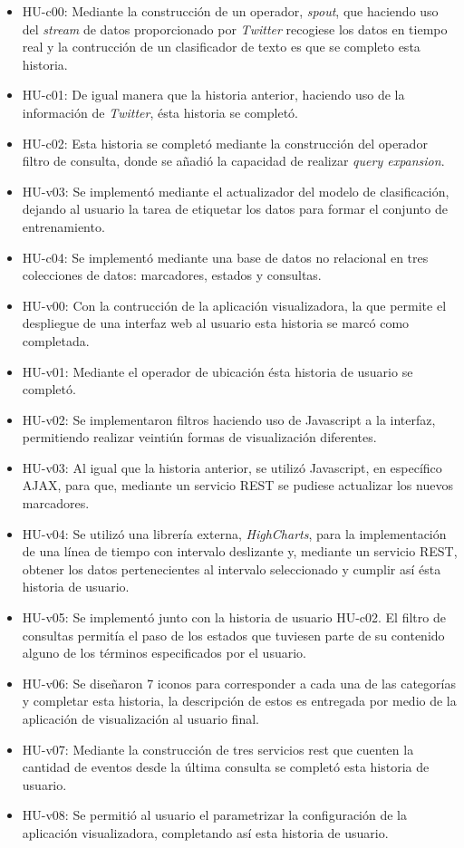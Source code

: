 \begin{itemize}
\item HU-c00: Mediante la construcción de un operador, \textit{spout}, que haciendo uso del \textit{stream} de datos proporcionado por \textit{Twitter} recogiese los datos en tiempo real y la contrucción de un clasificador de texto es que se completo esta historia.
\item HU-c01: De igual manera que la historia anterior, haciendo uso de la información de \textit{Twitter}, ésta historia se completó.
\item HU-c02: Esta historia se completó mediante la construcción del operador filtro de consulta, donde se añadió la capacidad de realizar \textit{query expansion}.
\item HU-v03: Se implementó mediante el actualizador del modelo de clasificación, dejando al usuario la tarea de etiquetar los datos para formar el conjunto de entrenamiento.
\item HU-c04: Se implementó mediante una base de datos no relacional en tres colecciones de datos: marcadores, estados y consultas.
\item HU-v00: Con la contrucción de la aplicación visualizadora, la que permite el despliegue de una interfaz web al usuario esta historia se marcó como completada.
\item HU-v01: Mediante el operador de ubicación ésta historia de usuario se completó.
\item HU-v02: Se implementaron filtros haciendo uso de Javascript a la interfaz, permitiendo realizar veintiún formas de visualización diferentes.
\item HU-v03: Al igual que la historia anterior, se utilizó Javascript, en específico AJAX, para que, mediante un servicio REST se pudiese actualizar los nuevos marcadores.
\item HU-v04: Se utilizó una librería externa, \textit{HighCharts}, para la implementación de una línea de tiempo con intervalo deslizante y, mediante un servicio REST, obtener los datos pertenecientes al intervalo seleccionado y cumplir así ésta historia de usuario.
\item HU-v05: Se implementó junto con la historia de usuario HU-c02. El filtro de consultas permitía el paso de los estados que tuviesen parte de su contenido alguno de los términos especificados por el usuario.
\item HU-v06: Se diseñaron 7 iconos para corresponder a cada una de las categorías y completar esta historia, la descripción de estos es entregada por medio de la aplicación de visualización al usuario final.
\item HU-v07: Mediante la construcción de tres servicios rest que cuenten la cantidad de eventos desde la última consulta se completó esta historia de usuario.
\item HU-v08: Se permitió al usuario el parametrizar la configuración de la aplicación visualizadora, completando así esta historia de usuario.
\end{itemize}

